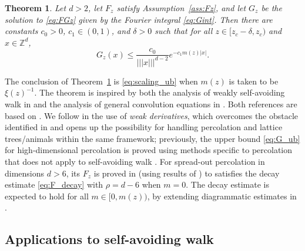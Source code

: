 \documentclass[11pt,hidelinks]{article}
\theoremstyle{plain}
\newtheorem{theorem}{Theorem}[section]
\numberwithin{equation}{section}
\newcommand{\Z}{\mathbb{Z}}
\newcommand{\inv}{^{-1}}
\renewcommand{\(}{\left(}
\renewcommand{\)}{\right)}
\newcommand{\1}{\mathds{1}}
\providecommand{\abs}[1]{\lvert#1\rvert}
\newcommand{\mz}{m(z)}
\newcommand{\veee}[1]{|\!|\!|#1|\!|\!|}
\providecommand{\nnnorm}[1]{\veee {#1} }
\begin{document}
\begin{theorem}
\label{thm:near_critical}
Let $d>2$, let $F_z$ satisfy Assumption~\ref{ass:Fz}, and 
let $G_z$ be the solution to \eqref{eq:FGz} given by the Fourier integral \eqref{eq:Gint}.
Then there are constants $c_0 > 0$, $c_1 \in (0,1)$, and $\delta>0$ such that for all $z \in [z_c - \delta, z_c)$ and $x\in \Z^d$, 
\begin{equation} \label{eq:G_ub}
G_z(x) \le \frac{ c_0 } { \nnnorm x^{d-2} } e^{-c_1 m(z) \abs x} .
\end{equation}
\end{theorem}

The conclusion of Theorem~\ref{thm:near_critical} is \eqref{eq:scaling_ub} when $\mz$ is taken to be $\xi(z)\inv$.
The theorem is inspired by both the analysis of weakly self-avoiding walk in \cite{Slad23_wsaw} and the analysis of general convolution equations in \cite{LS24a}. Both references are based on \cite{Slad22_lace}. 
We follow \cite{LS24a} in the use of \emph{weak derivatives}, which overcomes the obstacle identified in \cite[Remark~5.3]{Slad23_wsaw} and opens up the possibility for handling percolation and lattice trees/animals within the same framework; previously, the upper bound \eqref{eq:G_ub} for high-dimensional percolation is proved using methods specific to percolation that does not apply to self-avoiding walk \cite{HMS23}. 
For spread-out percolation in dimensions $d >  6$, 
its $F_z$ is proved in \cite{LS24b} (using results of \cite{HHS03}) to satisfies the decay estimate \eqref{eq:F_decay} with $\rho = d-6$ when $m=0$.
The decay estimate is expected to hold for all $m \in [0, \mz)$, by extending diagrammatic estimates in \cite{HHS03}. 







\subsection{Applications to self-avoiding walk}
\label{sec:saw_intro}
\end{document}
